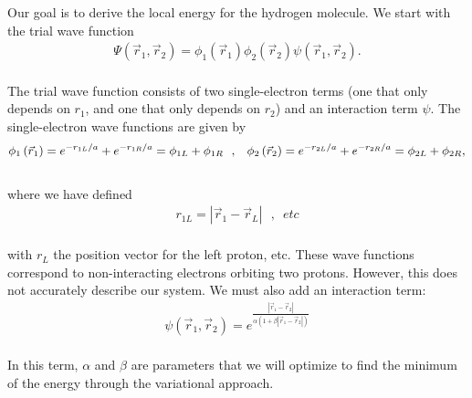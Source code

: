 \noindent Our goal is to derive the local energy for the hydrogen molecule. We start with the trial wave function
\begin{align}
\Psi \left( {{{\vec r}_1},{{\vec r}_2}} \right) = {\phi _1}\left( {{{\vec r}_1}} \right){\phi _2}\left( {{{\vec r}_2}} \right)\psi \left( {{{\vec r}_1},{{\vec r}_2}} \right).
\end{align}\\
The trial wave function consists of two single-electron terms (one that only depends on $r_1$, and one that only depends on $r_2$) and an interaction term $\psi$. The single-electron wave functions are given by
\begin{align}
{\phi _1}\left( {{{\vec r}_1}} \right) = {e^{ - {{{r_{1L}}} \mathord{\left/
 {\vphantom {{{r_{1L}}} a}} \right.
 \kern-\nulldelimiterspace} a}}} + {e^{ - {{{r_{1R}}} \mathord{\left/
 {\vphantom {{{r_{1R}}} a}} \right.
 \kern-\nulldelimiterspace} a}}} = {\phi _{1L}} + {\phi _{1R}}\,\,\,\,,\,\,\,\,\,{\phi _2}\left( {{{\vec r}_2}} \right) = {e^{ - {{{r_{2L}}} \mathord{\left/
 {\vphantom {{{r_{2L}}} a}} \right.
 \kern-\nulldelimiterspace} a}}} + {e^{ - {{{r_{2R}}} \mathord{\left/
 {\vphantom {{{r_{2R}}} a}} \right.
 \kern-\nulldelimiterspace} a}}} = {\phi _{2L}} + {\phi _{2R}},
 \end{align}\\
 where we have defined
 \begin{align}
{r_{1L}} = \left| {{{\vec r}_1} - {{\vec r}_L}} \right|\,\,\,\,,\,\,\,etc
 \end{align}\\
 with $r_L$ the position vector for the left proton, etc. These wave functions correspond to non-interacting electrons orbiting two protons. However, this does not accurately describe our system. We must also add an interaction term:
 \begin{align}
 \psi \left( {{{\vec r}_1},{{\vec r}_2}} \right) = {e^{\frac{{\left| {{{\vec r}_1} - {{\vec r}_2}} \right|}}{{\alpha \left( {1 + \beta \left| {{{\vec r}_1} - {{\vec r}_2}} \right|} \right)}}}}
 \end{align}\\
 In this term, $\alpha$ and $\beta$ are parameters that we will optimize to find the minimum of the energy through the variational approach.\\

